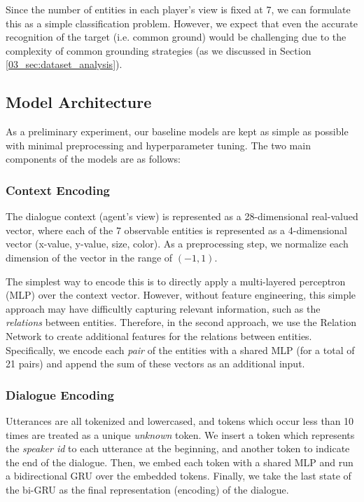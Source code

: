 Since the number of entities in each player's view is fixed at 7, we can formulate this as a simple classification problem. However, we expect that even the accurate recognition of the target (i.e. common ground) would be challenging due to the complexity of common grounding strategies (as we discussed in Section \ref{03_sec:dataset_analysis}).

\subsection{Model Architecture}

As a preliminary experiment, our baseline models are kept as simple as possible with minimal preprocessing and hyperparameter tuning. The two main components of the models are as follows:

\subsubsection{Context Encoding}
The dialogue context (agent's view) is represented as a 28-dimensional real-valued vector, where each of the 7 observable entities is represented as a 4-dimensional vector (x-value, y-value, size, color). As a preprocessing step, we normalize each dimension of the vector in the range of $(-1, 1)$.


The simplest way to encode this is to directly apply a multi-layered perceptron (MLP) over the context vector. However, without feature engineering, this simple approach may have difficultly capturing relevant information, such as the \textit{relations} between entities. Therefore, in the second approach, we use the Relation Network \citep{santoro2017simple} to create additional features for the relations between entities. Specifically, we encode each \textit{pair} of the entities with a shared MLP (for a total of 21 pairs) and append the sum of these vectors as an additional input.

\subsubsection{Dialogue Encoding}

Utterances are all tokenized and lowercased, and tokens which occur less than 10 times are treated as a unique \emph{unknown} token. We insert a token which represents the \emph{speaker id} to each utterance at the beginning, and another token to indicate the end of the dialogue. Then, we embed each token with a shared MLP and run a bidirectional GRU \citep{cho2014properties} over the embedded tokens. Finally, we take the last state of the bi-GRU as the final representation (encoding) of the dialogue. \\

